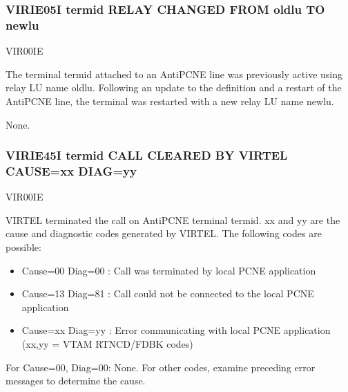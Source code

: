 \documentclass[letterpaper,10pt,english]{sphinxmanual}
\begin{document}
\subsubsection{VIRIE05I termid RELAY CHANGED FROM oldlu TO newlu}
\label{\detokenize{messages:virie05i-termid-relay-changed-from-oldlu-to-newlu}}\begin{description}
\sphinxAtStartPar
VIR00IE

\sphinxAtStartPar
The terminal termid attached to an AntiPCNE line was previously active using relay LU name oldlu. Following an update to the definition and a restart of the AntiPCNE line, the terminal was restarted with a new relay LU name newlu.

\sphinxAtStartPar
None.

\end{description}


\subsubsection{VIRIE45I termid CALL CLEARED BY VIRTEL CAUSE=xx DIAG=yy}
\label{\detokenize{messages:virie45i-termid-call-cleared-by-virtel-cause-xx-diag-yy}}\begin{description}
\sphinxAtStartPar
VIR00IE

\sphinxAtStartPar
VIRTEL terminated the call on AntiPCNE terminal termid. xx and yy are the cause and diagnostic codes generated by VIRTEL. The following codes are possible:
\begin{itemize}
\item {} 
\sphinxAtStartPar
Cause=00 Diag=00 : Call was terminated by local PCNE application

\item {} 
\sphinxAtStartPar
Cause=13 Diag=81 : Call could not be connected to the local PCNE application

\item {} 
\sphinxAtStartPar
Cause=xx Diag=yy : Error communicating with local PCNE application (xx,yy = VTAM RTNCD/FDBK codes)

\end{itemize}

\sphinxAtStartPar
For Cause=00, Diag=00: None. For other codes, examine preceding error messages to determine the cause.

\end{description}
\end{document}
